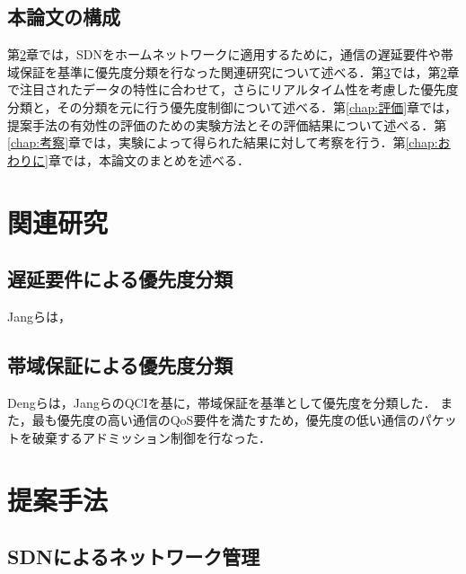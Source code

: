 \documentclass[a4paper,11pt,uplatex]{ujreport}
\begin{document}
\section{本論文の構成}
\label{sec:本論文の構成}

  第\ref{chap:関連研究}章では，SDNをホームネットワークに適用するために，通信の遅延要件や帯域保証を基準に優先度分類を行なった関連研究について述べる．第\ref{chap:提案手法}では，第\ref{chap:関連研究}章で注目されたデータの特性に合わせて，さらにリアルタイム性を考慮した優先度分類と，その分類を元に行う優先度制御について述べる．第\ref{chap:評価}章では，提案手法の有効性の評価のための実験方法とその評価結果について述べる．第\ref{chap:考察}章では，実験によって得られた結果に対して考察を行う．第\ref{chap:おわりに}章では，本論文のまとめを述べる．


\chapter{関連研究}
\label{chap:関連研究}

\section{遅延要件による優先度分類}
\label{sec:遅延要件による優先度分類}

  Jangらは，

\section{帯域保証による優先度分類}
\label{sec:帯域保証による優先度分類}

  Dengらは，JangらのQCIを基に，帯域保証を基準として優先度を分類した．
  また，最も優先度の高い通信のQoS要件を満たすため，優先度の低い通信のパケットを破棄するアドミッション制御を行なった．

\chapter{提案手法}
\label{chap:提案手法}

\section{SDNによるネットワーク管理}
\label{sec:SDNによるネットワーク管理}
\end{document}

